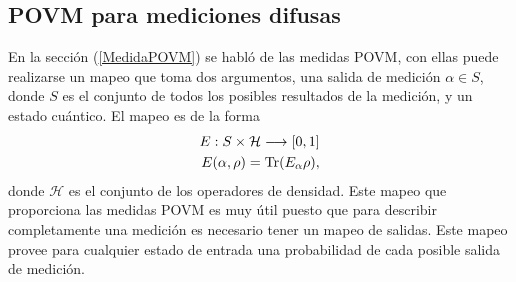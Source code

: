 \begin{comment}
De igual forma, sea $R$ el conjunto de pares ordenados $(i,l)$ de los índices de valores propios tales que su primer índice indica un valor propio del operador $A$ y el segundo índice indica algún valor propio del operador $B$. Sus respectivos operadores de proyección tienen la característica que  $|a_i b_l\rala a_i b_l|=|b_l a_i \rala b_l a_i |$, Los valores que toman $j$ y $k$ pueden ser $0$ o $1$. El operador de proyección asociado a los valores propios indexados por los elementos del conjunto $R$ es \[P^r_{a_i,b_l}=|a_i b_l\rala a_i b_l|=|b_l a_i \rala b_l a_i |.\] Luego, con una probabilidad $q$ el instrumento cuántico es \[\sum_{m,n} P_{a_m,b_n}\otimes P_{a_m,b_n}\rho P_{a_m,b_n},\] con $m,n=1,0$ y con una probabilidad $(1-q)$ es \[\sum_{(i,l)\in R} P_{a_i, b_l}\otimes  P^{r}_{a_i,b_l}\rho P^r_{a_i,n_l}+\sum_{(j,k)\in S}P_{a_j b_k} \otimes  \dfrac{1}{2}P^{s}_{a_j,b_k}\rho P^s_{a_j,b_k}.\]

Si el estado inicial se encuentra en el subespacio de $P^{s}_{a_j,b_k}$, el factor $(1/2)$ en la segunda sumatoria es la probabilidad con la que el sistema clásico indica  que el estado está en $|a_j b_k\ra $ o en $|b_k a_j\ra$. El instrumento es la suma convexa de estos dos posibilidades \begin{equation}
    \begin{split}
        \mathcal{I}_3(\rho)&=q\sum_{m,n}  P_{a_m,b_n}\otimes P_{a_m,b_n}\rho P_{a_m,b_n} +(1-q)\sum_{(i,l)\in R} P_{a_i, b_l}\otimes  P^{r}_{a_i,b_l}\rho P^r_{a_i,b_l}\\
        &+(1-q)\sum_{(j,k)\in S}P_{a_j,b_k} \otimes  \dfrac{1}{2}P^{s}_{a_j,b_k}\rho P^s_{a_j,b_k}.\\
    \end{split}
\end{equation}  
\end{comment}
\subsection{POVM para mediciones difusas}\label{Sec_POVM_para_mediciones_difusas} %

En la sección ({\ref{MedidaPOVM}}) se habló de las medidas POVM, con ellas puede
realizarse un mapeo que toma dos argumentos, una salida de medición $\alpha \in
S $, donde $S$ es el conjunto de todos los posibles resultados de la medición,
y un estado cuántico. El mapeo es de la forma 
\begin{equation}\begin{split}
    E:S\times \mathcal{H}\longrightarrow [0,1]\\
    E(\alpha,\rho)={\rm Tr}(E_\alpha\rho),
\end{split}\end{equation}
donde $\mathcal{H}$ es el conjunto de los operadores de densidad. Este mapeo
que proporciona las medidas POVM es muy útil puesto que para describir
completamente una medición es necesario tener un mapeo de salidas. Este mapeo
provee para cualquier estado de entrada una probabilidad de cada posible salida
de medición. 


